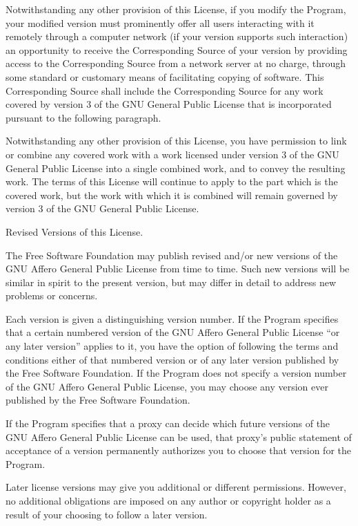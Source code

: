 Notwithstanding any other provision of this License, if you modify the Program, your modified version must prominently offer all users interacting with it remotely through a computer network (if your version supports such interaction) an opportunity to receive the Corresponding Source of your version by providing access to the Corresponding Source from a network server at no charge, through some standard or customary means of facilitating copying of software.  This Corresponding Source shall include the Corresponding Source for any work covered by version 3 of the GNU General Public License that is incorporated pursuant to the following paragraph.

Notwithstanding any other provision of this License, you have permission to link or combine any covered work with a work licensed under version 3 of the GNU General Public License into a single combined work, and to convey the resulting work.  The terms of this License will continue to apply to the part which is the covered work, but the work with which it is combined will remain governed by version 3 of the GNU General Public License.

\item Revised Versions of this License.

The Free Software Foundation may publish revised and/or new versions of the GNU Affero General Public License from time to time.  Such new versions will be similar in spirit to the present version, but may differ in detail to address new problems or concerns.

Each version is given a distinguishing version number.  If the Program specifies that a certain numbered version of the GNU Affero General Public License ``or any later version'' applies to it, you have the option of following the terms and conditions either of that numbered version or of any later version published by the Free Software Foundation.  If the Program does not specify a version number of the GNU Affero General Public License, you may choose any version ever published by the Free Software Foundation.

If the Program specifies that a proxy can decide which future versions of the GNU Affero General Public License can be used, that proxy's public statement of acceptance of a version permanently authorizes you to choose that version for the Program.

Later license versions may give you additional or different permissions.  However, no additional obligations are imposed on any author or copyright holder as a result of your choosing to follow a later version.

